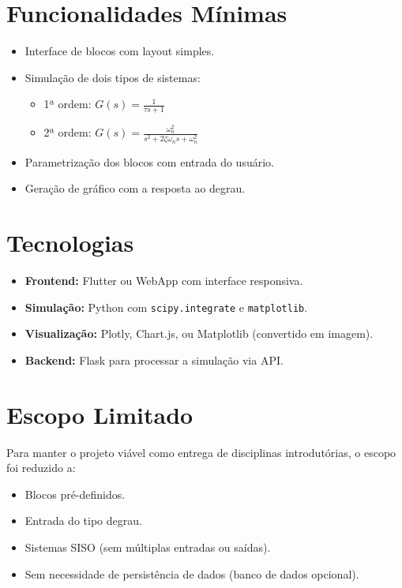 \documentclass[12pt]{article}
\begin{document}
\newpage

\section*{Funcionalidades Mínimas}

\begin{itemize}
    \item Interface de blocos com layout simples.
    \item Simulação de dois tipos de sistemas:
    \begin{itemize}
        \item 1ª ordem: \( G(s) = \frac{1}{\tau s + 1} \)
        \item 2ª ordem: \( G(s) = \frac{\omega_n^2}{s^2 + 2\zeta\omega_n s + \omega_n^2} \)
    \end{itemize}
    \item Parametrização dos blocos com entrada do usuário.
    \item Geração de gráfico com a resposta ao degrau.
\end{itemize}

\section*{Tecnologias}

\begin{itemize}
    \item \textbf{Frontend:} Flutter ou WebApp com interface responsiva.
    \item \textbf{Simulação:} Python com \texttt{scipy.integrate} e \texttt{matplotlib}.
    \item \textbf{Visualização:} Plotly, Chart.js, ou Matplotlib (convertido em imagem).
    \item \textbf{Backend:} Flask para processar a simulação via API.
\end{itemize}

\section*{Escopo Limitado}

Para manter o projeto viável como entrega de disciplinas introdutórias, o escopo foi reduzido a:
\begin{itemize}
    \item Blocos pré-definidos.
    \item Entrada do tipo degrau.
    \item Sistemas SISO (sem múltiplas entradas ou saídas).
    \item Sem necessidade de persistência de dados (banco de dados opcional).
\end{itemize}
\end{document}
